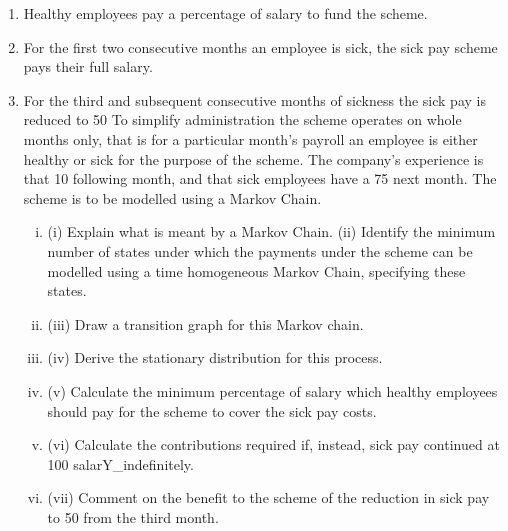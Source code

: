 \documentclass[a4paper,12pt]{article}
\begin{document}
\begin{enumerate}
[Total 13]
A company operates a sick pay scheme as follows:
\item Healthy employees pay a percentage of salary to fund the scheme.
\item For the first two consecutive months an employee is sick, the sick pay scheme
pays their full salary.
\item For the third and subsequent consecutive months of sickness the sick pay is
reduced to 50%
To simplify administration the scheme operates on whole months only, that is for a
particular month’s payroll an employee is either healthy or sick for the purpose of the
scheme.
The company’s experience is that 10%
following month, and that sick employees have a 75%
next month.
The scheme is to be modelled using a Markov Chain.
\begin{enumerate}[(i)]
\item(i) Explain what is meant by a Markov Chain. (ii) Identify the minimum number of states under which the payments under the
scheme can be modelled using a time homogeneous Markov Chain, specifying
these states.

\item (iii) Draw a transition graph for this Markov chain. 
\item (iv) Derive the stationary distribution for this process. 
\item (v) Calculate the minimum percentage of salary which healthy employees should
pay for the scheme to cover the sick pay costs.

\item (vi) Calculate the contributions required if, instead, sick pay continued at 100%
salarY_indefinitely.

\item (vii) Comment on the benefit to the scheme of the reduction in sick pay to 50%
from the third month.
\end{enumerate}



\end{enumerate}
\end{document}
